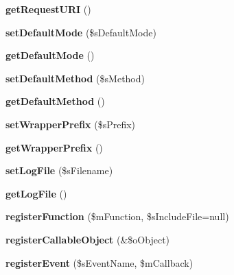 \begin{DoxyCompactItemize}
\item 
\hypertarget{classxajax_a923655f36fb3aff3bbc14d6f8d32670a}{
{\bfseries getRequestURI} ()}
\label{classxajax_a923655f36fb3aff3bbc14d6f8d32670a}

\item 
\hypertarget{classxajax_a93c7cb2a111d33424bbdafb6b274e5dd}{
{\bfseries setDefaultMode} (\$sDefaultMode)}
\label{classxajax_a93c7cb2a111d33424bbdafb6b274e5dd}

\item 
\hypertarget{classxajax_ade9689dd7ba6ef0d17bf242ecdd1f6f2}{
{\bfseries getDefaultMode} ()}
\label{classxajax_ade9689dd7ba6ef0d17bf242ecdd1f6f2}

\item 
\hypertarget{classxajax_a8728a2cab00d23da5b5795700f369b8b}{
{\bfseries setDefaultMethod} (\$sMethod)}
\label{classxajax_a8728a2cab00d23da5b5795700f369b8b}

\item 
\hypertarget{classxajax_a5e161c8ecbb00e607a26c38f17ff4036}{
{\bfseries getDefaultMethod} ()}
\label{classxajax_a5e161c8ecbb00e607a26c38f17ff4036}

\item 
\hypertarget{classxajax_af86c77b84343b0591e313caf60bf3388}{
{\bfseries setWrapperPrefix} (\$sPrefix)}
\label{classxajax_af86c77b84343b0591e313caf60bf3388}

\item 
\hypertarget{classxajax_a9615a8c618476b7d5cdf221173114fa5}{
{\bfseries getWrapperPrefix} ()}
\label{classxajax_a9615a8c618476b7d5cdf221173114fa5}

\item 
\hypertarget{classxajax_a14d8125e66114eed38608506d966419f}{
{\bfseries setLogFile} (\$sFilename)}
\label{classxajax_a14d8125e66114eed38608506d966419f}

\item 
\hypertarget{classxajax_a9630c710be77c62d55c92c9e01ed90e1}{
{\bfseries getLogFile} ()}
\label{classxajax_a9630c710be77c62d55c92c9e01ed90e1}

\item 
\hypertarget{classxajax_a6c7c42e54f7cf52a57f92d9cf9932411}{
{\bfseries registerFunction} (\$mFunction, \$sIncludeFile=null)}
\label{classxajax_a6c7c42e54f7cf52a57f92d9cf9932411}

\item 
\hypertarget{classxajax_a5570f5382fe1853f4bf3ddec7a13680a}{
{\bfseries registerCallableObject} (\&\$oObject)}
\label{classxajax_a5570f5382fe1853f4bf3ddec7a13680a}

\item 
\hypertarget{classxajax_ac22de33cb25e4e9de9c1c08b0626c883}{
{\bfseries registerEvent} (\$sEventName, \$mCallback)}
\label{classxajax_ac22de33cb25e4e9de9c1c08b0626c883}

\end{DoxyCompactItemize}
